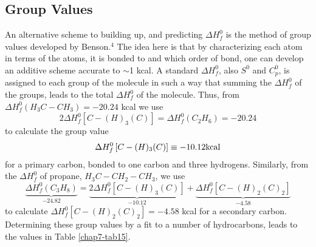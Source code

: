 \subsection{Group Values}

An alternative scheme to building up, and predicting $\Delta H^0_f$ 
is the method of group values developed by Benson.$^4$  The idea here 
is that by characterizing each atom in terms of the atoms, it is bonded to 
and which order of bond, one can develop an additive scheme accurate to 
$\sim$1 kcal.  A standard $\Delta H^0_f$, also $S^0$ and $C^0_p$, 
is assigned to each group of the molecule in such a way
that summing the $\Delta H^0_f$ of the groups, leads to the total 
$\Delta H^0_f$ of the molecule.  Thus, from $\Delta H^0_f (H_3C-CH_3) = 
-20.24$ kcal we use
\begin{equation}
2\Delta H^0_f \left[ C - (H)_3 (C) \right] = \Delta H^0_f 
(C_2H_6) = - 20.24
\end{equation}
to calculate the group value
\begin{equation}
\Delta H^0_f \left[ C - (H)_3 (C) \right] \equiv -10.12 {\rm kcal}
\end{equation}
for a primary carbon, bonded to one carbon and three hydrogens.
Similarly, from the $\Delta H^0_f$ of propane, $H_3C-CH_2-CH_3$, we use
\begin{equation}
\underbrace{\Delta H^0_f(C_3H_8)}_{-24.82} = \underbrace{2\Delta 
H^0_f[C-(H)_3(C)]}_{-10.12} + \underbrace{\Delta 
H^0_f[C-(H)_2(C)_2]}_{-4.58}
\end{equation}
to calculate $\Delta H^0_f [C -(H)_2(C)_2] = -4.58$ kcal for a secondary 
carbon.  Determining these group values by a fit to a number of 
hydrocarbons, leads to the values in Table \ref{chap7-tab15}.

